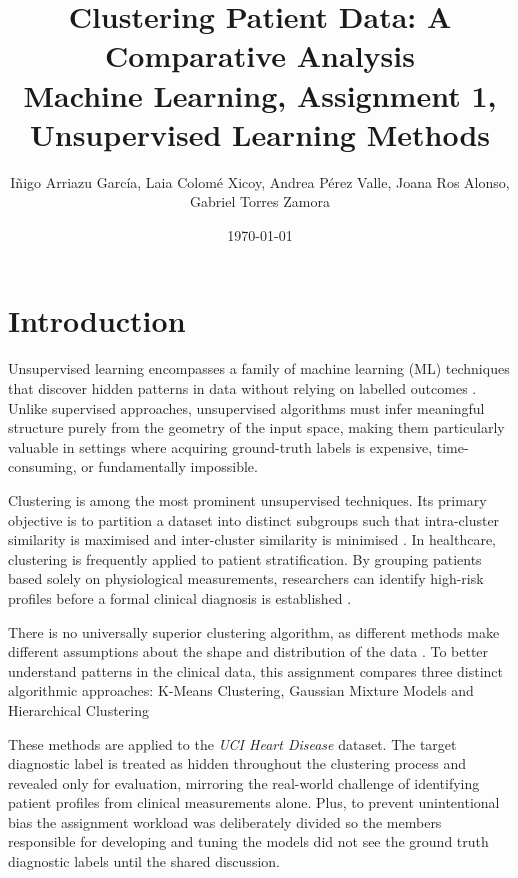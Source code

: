 \documentclass[twocolumn, fontsize=10pt]{article}
\title{
\Large
\centering
\textbf{Clustering Patient Data: A Comparative Analysis} \\
[8pt]
\Large \textcolor{RCharcoal}{Machine Learning, Assignment 1, Unsupervised Learning Methods} \\[10pt]}
\date{\today}
\author{{\normalsize Iñigo Arriazu García, Laia Colomé Xicoy, Andrea Pérez Valle, Joana Ros Alonso, Gabriel Torres Zamora }}
\makeatletter
\renewcommand{\maketitle}{\bgroup\setlength{\parindent}{0pt}
\begin{flushleft}
  \@title
  \@author \\ 
  \@date
\end{flushleft}\egroup
}
\makeatother
\begin{document}
\twocolumn[ \maketitle ]



\section{Introduction}
\label{sec:intro}

 {Unsupervised learning} encompasses a family of machine learning (ML) techniques that discover hidden patterns in data without relying on labelled outcomes \citep{hastie2009elements}. Unlike supervised approaches, unsupervised algorithms must infer meaningful structure purely from the geometry of the input space, making them particularly valuable in settings where acquiring ground-truth labels is expensive, time-consuming, or fundamentally impossible.


Clustering is among the most prominent unsupervised techniques. Its primary objective is to partition a dataset into distinct subgroups such that intra-cluster similarity is maximised and inter-cluster similarity is minimised \citep{jain2010data}. In healthcare, clustering is frequently applied to patient stratification. By grouping patients based solely on physiological measurements, researchers can identify high-risk profiles before a formal clinical diagnosis is established \citep{DeBenedictis2024, Hartung2024}.

There is no universally superior clustering algorithm, as different methods make different assumptions about the shape and distribution of the data \citep{bishop2006pattern}. To better understand patterns in the clinical data, this assignment compares three distinct algorithmic approaches:  {K-Means Clustering},  {Gaussian Mixture Models} and  {Hierarchical Clustering}

These methods are applied to the  {\textit{UCI Heart Disease}} dataset. The target diagnostic label is treated as hidden throughout the clustering process and revealed only for evaluation, mirroring the real-world challenge of identifying patient profiles from clinical measurements alone. Plus, to prevent unintentional bias the assignment workload was deliberately divided so the members responsible for developing and tuning the models did not see the ground truth diagnostic labels until the shared discussion.
\end{document}
